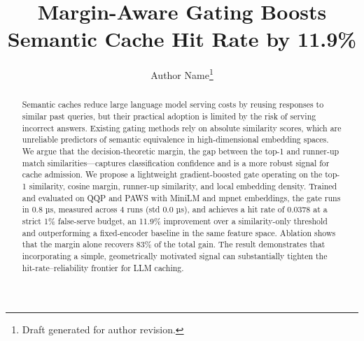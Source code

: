 \documentclass[11pt]{article}
\title{Margin-Aware Gating Boosts Semantic Cache Hit Rate by 11.9\%}
\author{Author Name\thanks{Draft generated for author revision.}}
\date{}
\begin{document}
\maketitle

\begin{abstract}
Semantic caches reduce large language model serving costs by reusing responses to similar past queries, but their practical adoption is limited by the risk of serving incorrect answers. Existing gating methods rely on absolute similarity scores, which are unreliable predictors of semantic equivalence in high-dimensional embedding spaces. We argue that the decision-theoretic margin, the gap between the top-1 and runner-up match similarities—captures classification confidence and is a more robust signal for cache admission. We propose a lightweight gradient-boosted gate operating on the top-1 similarity, cosine margin, runner-up similarity, and local embedding density. Trained and evaluated on QQP and PAWS with MiniLM and mpnet embeddings, the gate runs in 0.8 µs, measured across 4 runs (std 0.0 µs), and achieves a hit rate of 0.0378 at a strict 1\% false-serve budget, an 11.9\% improvement over a similarity-only threshold and outperforming a fixed-encoder baseline in the same feature space. Ablation shows that the margin alone recovers 83\% of the total gain. The result demonstrates that incorporating a simple, geometrically motivated signal can substantially tighten the hit-rate–reliability frontier for LLM caching.
\end{abstract}











\end{document}
